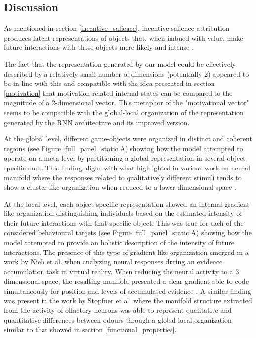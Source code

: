 \subsection{Discussion}
As mentioned in section  \ref{incentive_salience}, incentive salience attribution produces latent representations of objects that, when imbued with value, make future interactions with those objects more likely and intense \cite{berridge1998role,berridge2004motivation}. 

The fact that the representation generated by our model could be effectively described by a relatively small number of dimensions (potentially 2) appeared to be in line with this and compatible with the idea presented in section \ref{motivation} that motivation-related internal states can be compared to the magnitude of a 2-dimensional vector. This metaphor of the "motivational vector" seems to be compatible with the global-local organization of the representation generated by the RNN architecture and its improved version. 

At the global level, different game-objects were organized in distinct and coherent regions (see Figure \ref{full_panel_static}A) showing how the model attempted to operate on a meta-level by partitioning a global representation in several object-specific ones. This finding aligns with what highlighted in various work on neural manifold where the responses related to qualitatively different stimuli tends to show a cluster-like organization when reduced to a lower dimensional space \cite{stopfer2003intensity, gallego2017neural, ganmor2015thesaurus}. 

At the local level, each object-specific representation showed an internal gradient-like organization distinguishing individuals based on the estimated intensity of their future interactions with that specific object. This was true for each of the considered behavioural targets (see Figure \ref{full_panel_static}A) showing how the model attempted to provide an holistic description of the intensity of future interactions. The presence of this type of gradient-like organization emerged in a work by Nieh et al. \cite{nieh2021geometry} when analyzing neural responses during an evidence accumulation task in virtual reality. When reducing the neural activity to a 3 dimensional space, the resulting manifold presented a clear gradient able to code simultaneously for position and levels of accumulated evidence \cite{nieh2021geometry}. A similar finding was present in the work by Stopfner et al. \cite{stopfer2003intensity} where the manifold structure extracted from the activity of olfactory neurons was able to represent qualitative and quantitative differences between odours through a global-local organization similar to that showed in section \ref{functional_properties}.

